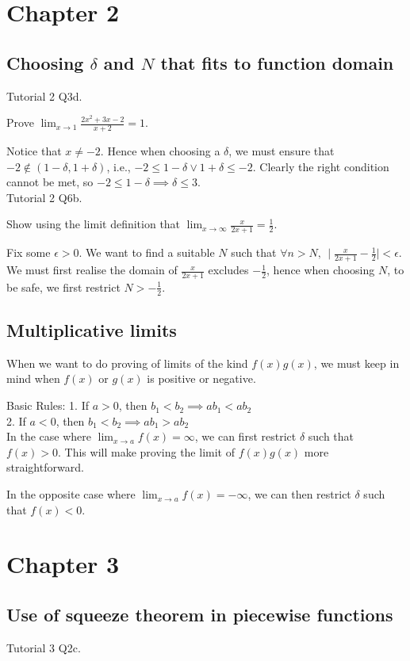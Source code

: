 \documentclass{article}
\begin{document}
\section{Chapter 2}
\subsection{Choosing $\delta$ and $N$ that fits to function domain}
Tutorial 2 Q3d.

Prove $\lim_{x\rightarrow 1}\frac{2x^2+3x-2}{x+2}=1$.

Notice that $x\neq -2$. Hence when choosing a $\delta$, we must ensure that $-2\notin (1-\delta, 1+\delta)$, i.e., $-2\leq 1-\delta \lor 1+\delta \leq -2$. Clearly the right condition cannot be met, so $-2\leq 1-\delta \implies \delta \leq 3$.
\\

Tutorial 2 Q6b.

Show using the limit definition that $\lim_{x\rightarrow  \infty}\frac{x}{2x+1}=\frac{1}{2}$.

Fix some $\epsilon>0$. We want to find a suitable $N$ such that $\forall n>N,\, \mid \frac{x}{2x+1}-\frac{1}{2}\mid<\epsilon$.\\
We must first realise the domain of $\frac{x}{2x+1}$ excludes $-\frac{1}{2}$, hence when choosing $N$, to be safe, we first restrict $N>-\frac{1}{2}$.

\subsection{Multiplicative limits}
When we want to do proving of limits of the kind $f(x)g(x)$, we must keep in mind when $f(x)$ or $g(x)$ is positive or negative.

Basic Rules:
1. If $a>0$, then $b_1<b_2 \implies ab_1<ab_2$\\
2. If $a<0$, then $b_1<b_2 \implies ab_1>ab_2$\\

In the case where $\lim_{x\rightarrow a}f(x)=\infty$, we can first restrict $\delta$ such that $f(x)>0$. This will make proving the limit of $f(x)g(x)$ more straightforward.

In the opposite case where $\lim_{x\rightarrow a}f(x)=-\infty$, we can then restrict $\delta$ such that $f(x)<0$.

\section{Chapter 3}
\subsection{Use of squeeze theorem in piecewise functions}
Tutorial 3 Q2c.
\end{document}
